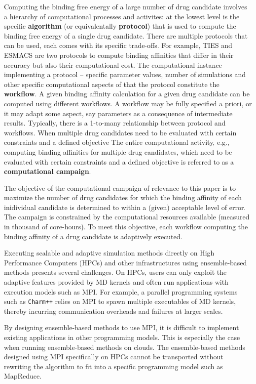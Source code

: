 Computing the binding free energy of a large number of drug candidate involves
a hierarchy of computational processes and activites: at the lowest level is
the specific {\bf algorithm} (or equivalentally {\bf protocol}) that is used
to compute the binding free energy of a single drug candidate. There are
multiple protocols that can be used, each comes with its specific trade-offs.
For example, TIES and ESMACS are two protocols to compute binding affinities
that differ in their accuracy but also their computational cost. The
computational instance implementing a protocol -- specific parameter values,
number of simulations and other specific computational aspects of that the
protocol constitute the {\bf workflow}. A given binding affinity calculation
for a given drug candidate can be computed using different workflows. A
workflow may be fully specified a priori, or it may adapt some aspect, say
parameters as a consequence of intermediate results. Typically, there is a
1-to-many relationship between protocol and workflows. When multiple drug
candidates need to be evaluated with certain constraints and a defined
objective The entire computational activity, e.g., computing binding
affinities for multiple drug candidates, which need to be evaluated with
certain constraints and a defined objective is referred to as a {\bf
computational campaign}.

The objective of the computational campaign of relevance to this paper is to
maximize the number of drug candidates for which the binding affinity of each
inidividual candidate is determined to within a (given) acceptable level of
error. The campaign is constrained by the computational resources available
(measured in thousand of core-hours). To meet this objective, each workflow
computing the binding affinity of a drug candidate is adaptively executed.


Executing scalable and adaptive simulation methods directly on High
Performance Computers (HPCs) and other infrastructures using ensemble-based
methods presents several challenges. On HPCs, users can only exploit the
adaptive features provided by MD kernels and often run applications with
execution models such as MPI. For example, a parallel programming systems
such as \texttt{Charm++} relies on MPI to spawn multiple executables of MD
kernels, thereby incurring communication overheads and failures at larger
scales.

By designing ensemble-based methods to use MPI, it is difficult to implement
existing applications in other programming models. This is especially the
case when running ensemble-based methods on clouds. The ensemble-based
methods designed using MPI specifically on HPCs cannot be transported without
rewriting the algorithm to fit into a specific programming model such as
MapReduce.

